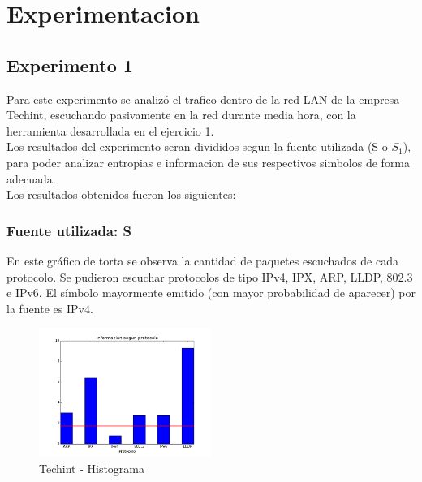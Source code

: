 \documentclass[final,narroweqnarray,inline]{ieee}
\begin{document}
\section{Experimentacion}


\subsection{Experimento 1}
Para este experimento se analiz\'o el trafico dentro de la red LAN de la empresa Techint, escuchando pasivamente
en la red durante media hora, con la herramienta desarrollada en el ejercicio 1. \\
Los resultados del experimento seran divididos segun la fuente utilizada (S o $S_{1}$), para poder analizar
entropias e informacion de sus respectivos simbolos de forma adecuada. \\
Los resultados obtenidos fueron los siguientes: 

\subsubsection{Fuente utilizada: S}



En este gráfico de torta se observa la cantidad de paquetes escuchados de cada
protocolo. Se pudieron escuchar protocolos de tipo IPv4, IPX, ARP, LLDP,
802.3 e IPv6. El símbolo mayormente emitido (con mayor probabilidad de
aparecer) por la fuente es IPv4.

\begin{figure}
\begin{center}
  \includegraphics[width=0.5\textwidth]{graficos/techint_histogram.png}
  \caption{Techint - Histograma}
  \label{techint-pie}
\end{center}
\end{figure}
\end{document}
